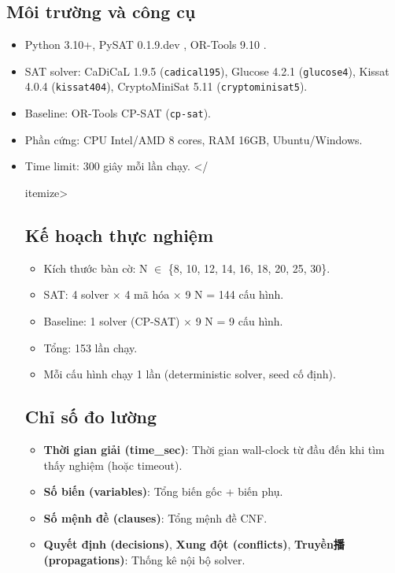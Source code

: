\documentclass[a4paper,fleqn]{cas-sc}
\begin{document}
\subsection{Môi trường và công cụ}
\begin{itemize}
    \item Python 3.10+, PySAT 0.1.9.dev \citep{pysat2024}, OR-Tools 9.10 \citep{ortools2024}.
    \item SAT solver: CaDiCaL 1.9.5 (\texttt{cadical195}), Glucose 4.2.1 (\texttt{glucose4}), Kissat 4.0.4 (\texttt{kissat404}), CryptoMiniSat 5.11 (\texttt{cryptominisat5}).
    \item Baseline: OR-Tools CP-SAT (\texttt{cp-sat}).
    \item Phần cứng: CPU Intel/AMD 8 cores, RAM 16GB, Ubuntu/Windows.
    \item Time limit: 300 giây mỗi lần chạy.
</{itemize>

\subsection{Kế hoạch thực nghiệm}
\label{sec:experiment-plan}

\begin{itemize}
    \item Kích thước bàn cờ: N $\in$ \{8, 10, 12, 14, 16, 18, 20, 25, 30\}.
    \item SAT: 4 solver $\times$ 4 mã hóa $\times$ 9 N = 144 cấu hình.
    \item Baseline: 1 solver (CP-SAT) $\times$ 9 N = 9 cấu hình.
    \item Tổng: 153 lần chạy.
    \item Mỗi cấu hình chạy 1 lần (deterministic solver, seed cố định).
\end{itemize}

\subsection{Chỉ số đo lường}
\begin{itemize}
    \item \textbf{Thời gian giải (time\_sec)}: Thời gian wall-clock từ đầu đến khi tìm thấy nghiệm (hoặc timeout).
    \item \textbf{Số biến (variables)}: Tổng biến gốc + biến phụ.
    \item \textbf{Số mệnh đề (clauses)}: Tổng mệnh đề CNF.
    \item \textbf{Quyết định (decisions)}, \textbf{Xung đột (conflicts)}, \textbf{Truyền播 (propagations)}: Thống kê nội bộ solver.
\end{itemize}

}
\end{itemize}
\end{document}
